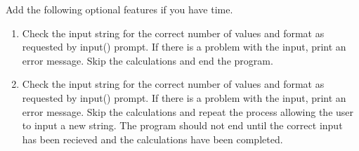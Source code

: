 \documentclass[12pt]{article}
\begin{document}
\begin{description}[labelindent=1cm]
        \item [\textbf{\underline{Optional Advanced Features:}}] Add the following optional features if you have time. 
        \begin{enumerate}
            \item Check the input string for the correct number of values and format as requested by input() prompt. If there is a problem with the input, print an error message. Skip the calculations and end the program.
            \item Check the input string for the correct number of values and format as requested by input() prompt. If there is a problem with the input, print an error message. Skip the calculations and repeat the process allowing the user to input a new string. The program should not end until the correct input has been recieved and the calculations have been completed. 
        \end{enumerate} 
       

        \item[\textbf{\underline{Example Code:}}] \hfill \vspace{0mm}


\end{description}
\end{document}
